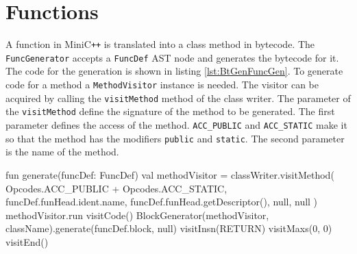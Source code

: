 \section{Functions}

A function in MiniC\verb|++| is translated into a class method in bytecode. The \verb|FuncGenerator| accepts a \verb|FuncDef| AST node and generates the bytecode for it. The code for the generation is shown in listing \ref{lst:BtGenFuncGen}. To generate code for a method a \verb|MethodVisitor| instance is needed. The visitor can be acquired by calling the \verb|visitMethod| method of the class writer. The parameter of the \verb|visitMethod| define the signature of the method to be generated. The first parameter defines the access of the method. \verb|ACC_PUBLIC| and \verb|ACC_STATIC| make it so that the method has the modifiers \verb|public| and \verb|static|. The second parameter is the name of the method. 

\begin{KotlinCode}[float,numbers=none,caption=Top-level code for the bytecode generation., label=lst:BtGenFuncGen]
fun generate(funcDef: FuncDef) {
    val methodVisitor = classWriter.visitMethod(
        Opcodes.ACC_PUBLIC + Opcodes.ACC_STATIC,
        funcDef.funHead.ident.name,
        funcDef.funHead.getDescriptor(),
        null,
        null
    )
    methodVisitor.run {
        visitCode()
        BlockGenerator(methodVisitor, className).generate(funcDef.block, null)
        visitInsn(RETURN)
        visitMaxs(0, 0)
        visitEnd()
    }
}
\end{KotlinCode}


